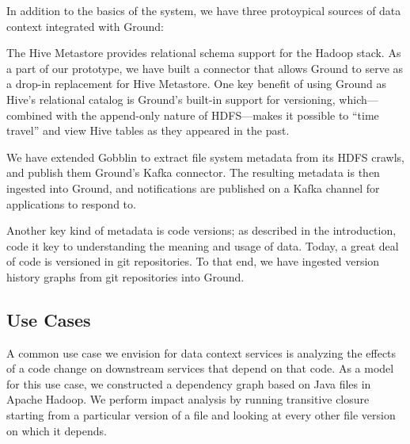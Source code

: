 \documentclass{sig-alternate}
\begin{document}
In addition to the basics of the system, we have three protoypical sources of data context integrated with Ground:

 The Hive Metastore provides relational schema support for the Hadoop stack.
As a part of our prototype, we have built a connector that allows Ground to serve as a drop-in replacement for Hive Metastore.
One key benefit of using Ground as Hive's relational catalog is Ground's built-in support for versioning, which---combined with the append-only nature of HDFS---makes it possible to ``time travel'' and view Hive tables as they appeared in the past.

 We have extended Gobblin to extract file system metadata from its HDFS crawls, and publish them Ground's Kafka connector. The resulting 
metadata is then ingested into Ground, and notifications are published on a Kafka channel for applications to respond to.

 Another key kind of metadata is code versions; as described in the introduction, code it key to understanding the meaning and usage of data.
Today, a great deal of code is versioned in git repositories.
To that end, we have ingested version history graphs from git repositories into Ground.
\smallitembot




\subsection{Use Cases}

 A common use case we envision for data context services is analyzing the effects of a code change on downstream services that depend on that code.
As a model for this use case, we constructed a dependency graph based on Java files in Apache Hadoop.
We perform impact analysis by running transitive closure starting from a particular version of a file and looking at every other file version on which it depends.
\end{document}
